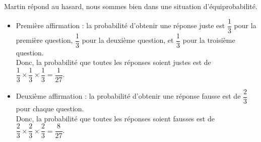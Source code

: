 Martin répond au hasard, nous sommes bien dans une situation d'équiprobabilité.   \begin{itemize}
      \item Première affirmation : la probabilité d'obtenir une réponse juste est $\dfrac13$ pour la première question, $\dfrac13$ pour la deuxième question, et $\dfrac13$ pour la troisième question. \\
      Donc, la probabilité que toutes les réponses soient justes est de $\dfrac13\times\dfrac13\times\dfrac13 =\dfrac{1}{27}$. \\ [1mm]
   \smallskip
   \item Deuxième affirmation : la probabilité d'obtenir une réponse fausse est de $\dfrac23$ pour chaque question. \\ [1mm]
   Donc, la probabilité que toutes les réponses soient fausses est de $\dfrac23\times\dfrac23\times\dfrac23 =\dfrac{8}{27}$. \\ [1mm]
   \end{itemize}
